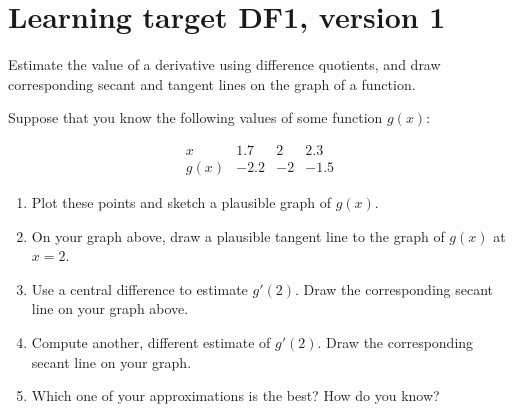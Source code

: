 \section{Learning target DF1, version 1}

Estimate the value of a derivative using difference quotients, and draw corresponding secant and tangent lines on the graph of a function.

\hrulefill


\everymath{\displaystyle}

Suppose that you know the following values of some function $g(x)$:

\[
\begin{array}{c||r|r|r}
      x  &  1.7 &  2   &  2.3 \\\hline
    g(x) & -2.2 & -2   & -1.5
\end{array}
\]
\begin{enumerate}[leftmargin=0pt]

\item Plot these points and sketch a plausible graph of $g(x)$.


\item On your graph above, draw a plausible tangent line to the graph of $g(x)$ at $x=2$.

\item Use a central difference to estimate $g'(2)$. Draw the corresponding secant line on your graph above.

\vfill

\item Compute another, different estimate of $g'(2)$. Draw the corresponding secant line on your graph.

\vfill

\item Which one of your approximations is the best? How do you know?

\vspace{1cm}

\end{enumerate}

